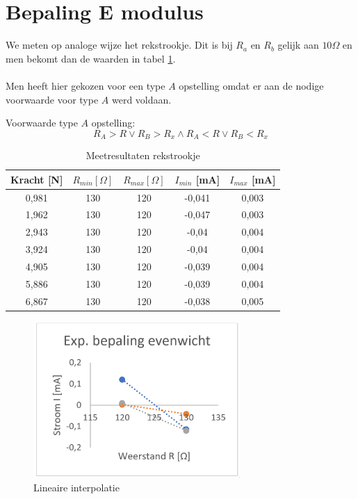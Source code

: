 \section{Bepaling E modulus}

We meten op analoge wijze het rekstrookje.
Dit is bij $R_a$ en $R_b$ gelijk aan $10\Omega$ en 
men bekomt dan de waarden in tabel \ref{tab:rekstrookje}.
\\ \\
Men heeft hier gekozen voor een type $A$ opstelling omdat
er aan de nodige voorwaarde voor type $A$ werd voldaan.

Voorwaarde type $A$ opstelling:
$$ R_A > R \vee R_B > R_x \wedge R_A < R \vee R_B < R_x $$

\begin{table}[h]
    \centering
    \caption{Meetresultaten rekstrookje}
    \label{tab:rekstrookje}

    \begin{tabular}{| c | c | c | c | c |}
        \hline
        Kracht [N] & $R_{min} [\Omega]$& $R_{max} [\Omega]$& $I_{min}$ [mA] & $I_{max}$ [mA] \\ \hline
        0,981      & 130               & 120               & -0,041    & 0,003 \\ \hline
        1,962      & 130               & 120               &-0,047     & 0,003 \\ \hline
        2,943      & 130               & 120               &-0,04      & 0,004 \\ \hline
        3,924      & 130               & 120               &-0,04      & 0,004 \\ \hline
        4,905      & 130               & 120               &-0,039     & 0,004 \\ \hline
        5,886      & 130               & 120               &-0,039     & 0,004 \\ \hline
        6,867      & 130               & 120               &-0,038     & 0,005 \\ \hline
    \end{tabular}
\end{table}

\begin{figure}[h]
    \centering
    \caption{Lineaire interpolatie}
    \label{fig:lin_interpol_e}
    \includegraphics[width=0.7\textwidth]{img/tweede.png}
\end{figure}

